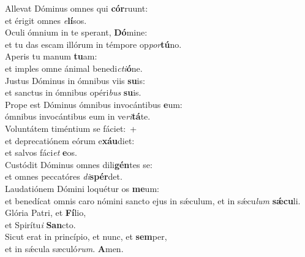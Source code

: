 \evenverse Allevat Dóminus omnes qui \textbf{cór}ruunt:~\*\\
\evenverse et érigit omnes \textit{e}\textbf{lí}sos.\\
\oddverse Oculi ómnium in te sperant, \textbf{Dó}mine:~\*\\
\oddverse et tu das escam illórum in témpore op\textit{por}\textbf{tú}no.\\
\evenverse Aperis tu manum \textbf{tu}am:~\*\\
\evenverse et imples omne ánimal benedi\textit{cti}\textbf{ó}ne.\\
\oddverse Justus Dóminus in ómnibus viis \textbf{su}is:~\*\\
\oddverse et sanctus in ómnibus opéri\textit{bus} \textbf{su}is.\\
\evenverse Prope est Dóminus ómnibus invocántibus \textbf{e}um:~\*\\
\evenverse ómnibus invocántibus eum in ve\textit{ri}\textbf{tá}te.\\
\oddverse Voluntátem timéntium se fáciet:~+\\
\oddverse  et deprecatiónem eórum e\textbf{xáu}diet:~\*\\
\oddverse et salvos fáci\textit{et} \textbf{e}os.\\
\evenverse Custódit Dóminus omnes dili\textbf{gén}tes se:~\*\\
\evenverse et omnes peccatóres \textit{di}\textbf{spér}det.\\
\oddverse Laudatiónem Dómini loquétur os \textbf{me}um:~\*\\
\oddverse et benedícat omnis caro nómini sancto ejus in sǽculum, et in sǽcu\textit{lum} \textbf{sǽ}\textbf{cu}li.\\
\evenverse Glória Patri, et \textbf{Fí}lio,~\*\\
\evenverse et Spirítu\textit{i} \textbf{San}cto.\\
\oddverse Sicut erat in princípio, et nunc, et \textbf{sem}per,~\*\\
\oddverse et in sǽcula sæculó\textit{rum}. \textbf{A}men.\\

